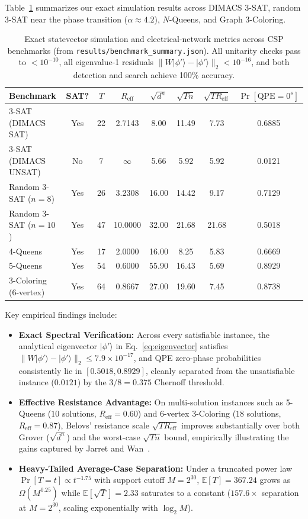 \documentclass[11pt,a4paper]{article}
\begin{document}
Table~\ref{tab:benchmarks} summarizes our exact simulation results across DIMACS 3-SAT, random 3-SAT near the phase transition ($\alpha \approx 4.2$), $N$-Queens, and Graph 3-Coloring.

\begin{table}[h!]
\centering
\small
\begin{tabular}{@{}lccccccc@{}}
\toprule
\textbf{Benchmark} & \textbf{SAT?} & $T$ & $R_{\mathrm{eff}}$ & $\sqrt{d^n}$ & $\sqrt{Tn}$ & $\sqrt{T R_{\mathrm{eff}}}$ & $\Pr[\text{QPE}=0^s]$ \\
\midrule
3-SAT (DIMACS SAT) & Yes & 22 & 2.7143 & 8.00 & 11.49 & 7.73 & 0.6885 \\
3-SAT (DIMACS UNSAT) & No & 7 & $\infty$ & 5.66 & 5.92 & 5.92 & 0.0121 \\
Random 3-SAT ($n=8$) & Yes & 26 & 3.2308 & 16.00 & 14.42 & 9.17 & 0.7129 \\
Random 3-SAT ($n=10$) & Yes & 47 & 10.0000 & 32.00 & 21.68 & 21.68 & 0.5018 \\
4-Queens & Yes & 17 & 2.0000 & 16.00 & 8.25 & 5.83 & 0.6669 \\
5-Queens & Yes & 54 & 0.6000 & 55.90 & 16.43 & 5.69 & 0.8929 \\
3-Coloring (6-vertex) & Yes & 64 & 0.8667 & 27.00 & 19.60 & 7.45 & 0.8738 \\
\bottomrule
\end{tabular}
\caption{Exact statevector simulation and electrical-network metrics across CSP benchmarks (from \texttt{results/benchmark\_summary.json}). All unitarity checks pass to $<10^{-10}$, all eigenvalue-1 residuals $\|W|\phi'\rangle - |\phi'\rangle\|_2 < 10^{-16}$, and both detection and search achieve 100\% accuracy.}
\label{tab:benchmarks}
\end{table}

Key empirical findings include:
\begin{itemize}
    \item \textbf{Exact Spectral Verification:} Across every satisfiable instance, the analytical eigenvector $|\phi'\rangle$ in Eq.~\eqref{eq:eigenvector} satisfies $\|W|\phi'\rangle - |\phi'\rangle\|_2 \le 7.9 \times 10^{-17}$, and QPE zero-phase probabilities consistently lie in $[0.5018, 0.8929]$, cleanly separated from the unsatisfiable instance ($0.0121$) by the $3/8 = 0.375$ Chernoff threshold.
    \item \textbf{Effective Resistance Advantage:} On multi-solution instances such as 5-Queens ($10$ solutions, $R_{\mathrm{eff}} = 0.60$) and 6-vertex 3-Coloring ($18$ solutions, $R_{\mathrm{eff}} = 0.87$), Belovs' resistance scale $\sqrt{T R_{\mathrm{eff}}}$ improves substantially over both Grover ($\sqrt{d^n}$) and the worst-case $\sqrt{Tn}$ bound, empirically illustrating the gains captured by Jarret and Wan~\cite{jarret2018}.
    \item \textbf{Heavy-Tailed Average-Case Separation:} Under a truncated power law $\Pr[T=t] \propto t^{-1.75}$ with support cutoff $M = 2^{30}$, $\mathbb{E}[T] = 367.24$ grows as $\Omega(M^{0.25})$ while $\mathbb{E}[\sqrt{T}] = 2.33$ saturates to a constant ($157.6\times$ separation at $M=2^{30}$, scaling exponentially with $\log_2 M$).
\end{itemize}
\end{document}
